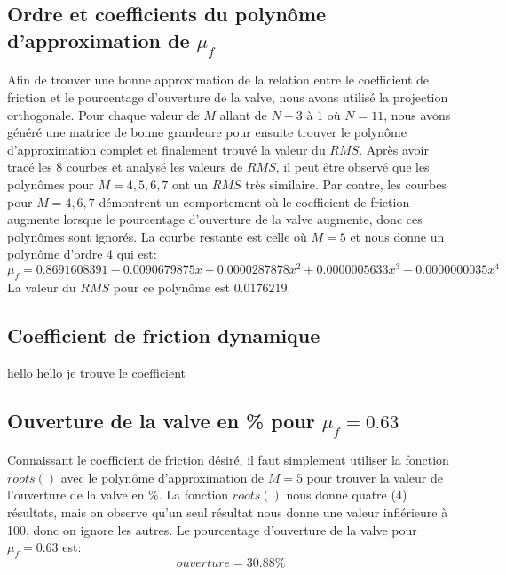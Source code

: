 \documentclass{article}
\begin{document}
\subsection{Ordre et coefficients du polynôme d'approximation de $\mu_f$}
Afin de trouver une bonne approximation de la relation entre le coefficient de friction et le pourcentage d'ouverture de la valve, nous avons utilisé la projection orthogonale. Pour chaque valeur de $M$ allant de $N-3$ à 1 où $N=11$, nous avons généré une matrice de bonne grandeure pour ensuite trouver le polynôme d'approximation complet et finalement trouvé la valeur du $RMS$. Après avoir tracé les 8 courbes et analysé les valeurs de $RMS$, il peut être observé que les polynômes pour $M=4,5,6,7$ ont un $RMS$ très similaire. Par contre, les courbes pour $M=4,6,7$ démontrent un comportement où le coefficient de friction augmente lorsque le pourcentage d'ouverture de la valve augmente, donc ces polynômes sont ignorés. La courbe restante est celle où $M=5$ et nous donne un polynôme d'ordre 4 qui est:
\begin{equation}
	\mu_f = 0.8691608391-0.0090679875x+0.0000287878x^2+0.0000005633x^3-0.0000000035x^4 
\end{equation}
La valeur du $RMS$ pour ce polynôme est $0.0176219$.

\subsection{Coefficient de friction dynamique}
hello hello je trouve le coefficient

\subsection{Ouverture de la valve en \% pour $\mu_f=0.63$}
Connaissant le coefficient de friction désiré, il faut simplement utiliser la fonction $roots()$ avec le polynôme d'approximation de $M=5$ pour trouver la valeur de l'ouverture de la valve en \%. La fonction $roots()$ nous donne quatre (4) résultats, mais on observe qu'un seul résultat nous donne une valeur infiérieure à 100, donc on ignore les autres. Le pourcentage d'ouverture de la valve pour $\mu_f=0.63$ est:
\begin{equation}
	ouverture = 30.88\%
\end{equation}
\end{document}
